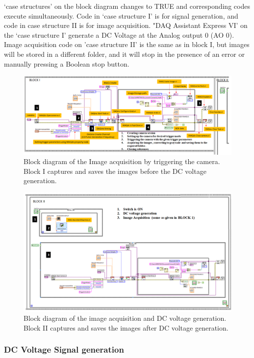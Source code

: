 \documentclass[journal=jacsat,manuscript=article]{achemso}
\begin{document}
‘case structures’ on the block diagram changes to TRUE and corresponding codes execute simultaneously. Code in ‘case structure I’ is for signal generation, and code in case structure II is for image acquisition. "DAQ Assistant Express VI' on the ‘case structure I’
generate a DC Voltage at the Analog output 0 (AO 0). Image acquisition code on 'case structure II' is the same as in block I, but images will be stored in a different folder, and it will stop in the presence of an error or manually pressing a Boolean stop button.
\begin{figure}[H]
	\centering
	\includegraphics[width=1.3\linewidth,angle=90 ]{Block_1.png}
	\caption{Block diagram of the Image acquisition by triggering the
		camera. Block I captures and saves the images before the DC
		voltage generation.}
	\label{fig:ex4}
\end{figure}

\begin{figure}[H]
	\centering
	\includegraphics[width=1.3\linewidth,angle=90]{Block_2.png}
	\caption{Block diagram of the image acquisition and DC voltage
		generation. Block II captures and saves the images after DC
		voltage generation.}
	\label{fig:ex5}
\end{figure}


\subsubsection{DC Voltage Signal generation}
\end{document}
